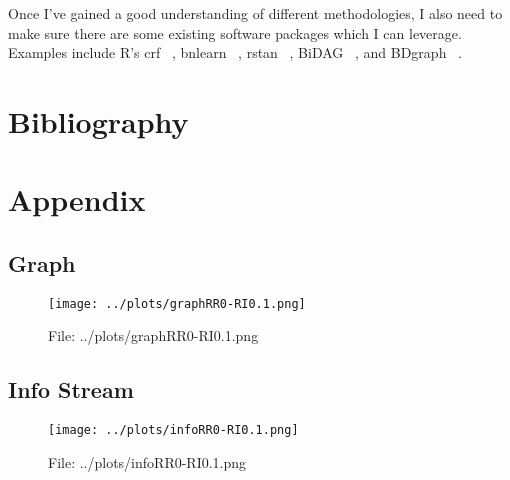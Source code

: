 \documentclass[a4paper, 11pt]{report}
\begin{document}
	Once I've gained a good understanding of different methodologies, I also need to make sure there are some existing software packages which I can leverage. Examples include R's crf ~\cite{ling2019}, bnlearn ~\cite{scutari2021}, rstan ~\cite{guo2021}, BiDAG ~\cite{suter2021}, and BDgraph ~\cite{mohammadi2021}.

\chapter*{Bibliography}
\printbibliography

\chapter{Appendix}
\section{Graph}

\begin{figure}[h] \caption{File: ../plots/graphRR0-RI0.1.png} \texttt{[image: ../plots/graphRR0-RI0.1.png]} \end{figure}
\section{Info Stream}
\begin{figure}[h] \caption{File: ../plots/infoRR0-RI0.1.png} \texttt{[image: ../plots/infoRR0-RI0.1.png]} \end{figure}
\end{document}
